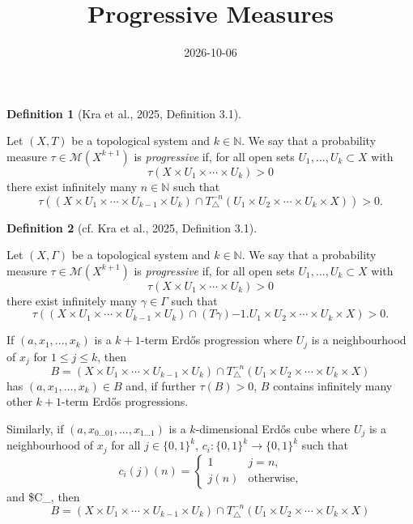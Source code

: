 \documentclass[
  british,
]{article}
\title{Progressive Measures}
\author{}
\date{2026-10-06}
\theoremstyle{plain}
\theoremstyle{plain}
\theoremstyle{plain}
\theoremstyle{definition}
\newtheorem{definition}{Definition}[section]
\theoremstyle{remark}
\newcommand{\Group}{{\Gamma}}
\newcommand{\GroupActionPreImage}[2]{(T{#1}){-1}.{#2}}
\newcommand{\GroupElement}{{\gamma}}
\begin{document}
\maketitle


\begin{definition}[{Kra et al., 2025, Definition
3.1}]\protect\hypertarget{def-ProgressiveMeasure0}{}\label{def-ProgressiveMeasure0}

Let \((X,T)\) be a topological system and \(k\in\mathbb{N}\). We say
that a probability measure \(\tau\in\mathcal{M}(X^{k+1})\) is
\emph{progressive} if, for all open sets \(U_1,...,U_k\subset X\) with
\[\tau(X\times U_1\times\cdots\times U_k)>0 \] there exist infinitely
many \(n\in\mathbb{N}\) such that
\[\tau((X\times U_1\times\cdots\times U_{k-1}\times U_k)\cap T_{\triangle}^{-n}(U_1\times U_2\times\cdots\times U_k\times X))>0. \]

\end{definition}

\begin{definition}[{cf. Kra et al., 2025, Definition
3.1}]\protect\hypertarget{def-ProgressiveMeasure}{}\label{def-ProgressiveMeasure}

Let \((X,\Group)\) be a topological system and \(k\in\mathbb{N}\). We
say that a probability measure \(\tau\in\mathcal{M}(X^{k+1})\) is
\emph{progressive} if, for all open sets \(U_1,...,U_k\subset X\) with
\[\tau(X\times U_1\times\cdots\times U_k)>0 \] there exist infinitely
many \(\GroupElement\in\Group\) such that
\[\tau((X\times U_1\times\cdots\times U_{k-1}\times U_k)\cap \GroupActionPreImage{\GroupElement}{U_1\times U_2\times\cdots\times U_k\times X})>0. \]

\end{definition}

If \((a,x_1,...,x_k)\) is a \(k+1\)-term Erdős progression where \(U_j\)
is a neighbourhood of \(x_j\) for \(1\leq j\leq k\), then
\[B=(X\times U_1\times\cdots\times U_{k-1}\times U_k)\cap T_{\triangle}^{-n}(U_1\times U_2\times\cdots\times U_k\times X)\]
has \((a,x_1,...,x_k)\in B\) and, if further \(\tau(B)>0\), \(B\)
contains infinitely many other \(k+1\)-term Erdős progressions.

Similarly, if \((a,x_{0...01},...,x_{1...1})\) is a \(k\)-dimensional
Erdős cube where \(U_j\) is a neighbourhood of \(x_j\) for all
\(j\in\{0,1\}^k\), \(c_i:\{0,1\}^k\rightarrow\{0,1\}^k\) such that
\[c_i(j)(n)=\begin{cases}1 & j=n,\\ j(n)&\text{otherwise}, \end{cases} \]
and \$C\_, then
\[B=(X\times U_1\times\cdots\times U_{k-1}\times U_k)\cap T_{\triangle}^{-n}(U_1\times U_2\times\cdots\times U_k\times X)\]
\end{document}
